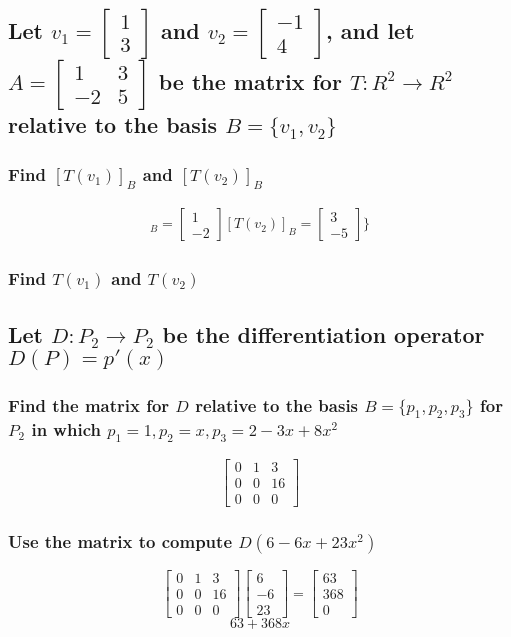 \documentclass[12pt, a4paper]{article}
\begin{document}
		\subsection{Let $v_1=\begin{bmatrix}1\\3\end{bmatrix}$ and $v_2=\begin{bmatrix}-1\\4\end{bmatrix}$, and let $A=\begin{bmatrix}1&3\\-2&5\end{bmatrix}$ be the matrix for $T:R^2\rightarrow R^2$ relative to the basis $B=\{v_1,v_2\}$}
			\subsubsection{Find $[T(v_1)]_B$ and $[T(v_2)]_B$}
				\begin{align*}
					[T(v_1)]_B=\begin{bmatrix}1\\-2\end{bmatrix}
					[T(v_2)]_B=\begin{bmatrix}3\\-5\end{bmatrix}\}
				\end{align*}
			\subsubsection{Find $T(v_1)$ and $T(v_2)$}
					
		\subsection{Let $D:P_2\rightarrow P_2$ be the differentiation operator $D(P)=p'(x)$}
			\subsubsection{Find the matrix for $D$ relative to the basis $B=\{p_1,p_2,p_3\}$ for $P_2$ in which $p_1=1,p_2=x,p_3=2-3x+8x^2$}
				$$\begin{bmatrix} 0 & 1 & 3\\0&0&16\\0&0&0\end{bmatrix}$$
			\subsubsection{Use the matrix to compute $D(6-6x+23x^2)$}
				$$\begin{bmatrix} 0 & 1 & 3\\0&0&16\\0&0&0\end{bmatrix}\begin{bmatrix}6\\-6\\23\end{bmatrix}=\begin{bmatrix}63\\368\\0\end{bmatrix}$$
				$$63+368x$$
\end{document}
